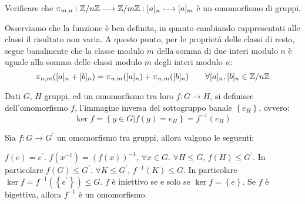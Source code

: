 \documentclass[11pt]{scrartcl}
\begin{document}
\begin{exercise}
Verificare che $\pi_{m,n}: {\mathbb Z}/n{\mathbb Z} \longrightarrow {\mathbb Z}/m{\mathbb Z} : [a]_n \longmapsto [a]_m$ è un omomorfismo di gruppi.
\end{exercise}	

\begin{soln}
Osserviamo che la funzione è ben definita, in quanto cambiando rappresentati alle classi il risultato non varia. A questo punto, per le proprietà delle classi di resto, segue banalmente che la classe modulo $m$ della somma di due interi modulo  $n$ è uguale alla somma delle classi modulo $m$ degli interi modulo $n$:
	\[ \pi_{n,m}([a]_n + [b]_n)
	=
	\pi_{n,m}([a]_n)
	+
	\pi_{n,m}([b]_n)
	\qquad
	\forall [a]_n, [b]_n \in {\mathbb Z}/n{\mathbb Z}
	\]
\end{soln}


\begin{definition}
Dati $G$, $H$ gruppi, ed un omomorfismo tra loro $f: G \longrightarrow H$, si definisce  dell'omomorfismo $f$, l'immagine inversa del sottogruppo banale $\left\{e_H\right\}$, ovvero:
	\[ \ker f = \left\{g \in G | f(g) = e_H\right\} = f^{-1}(e_H)
	\]
\end{definition}

\begin{theorem}
\label{thm:g_quattro}
Sia $f:G \longrightarrow G^{\prime}$ un omomorfismo tra gruppi, allora valgono le seguenti:
\begin{enumerate}[(1)]
	\ii $f(e)=e^{\prime}$.
	\ii $f(x^{-1})=(f(x))^{-1}$, $\forall x \in G$.
	\ii $\forall H \leqslant G$, $f(H) \leqslant G^{\prime}$. In particolare $f(G) \leqslant G^{\prime}$.
	\ii $\forall K \leqslant G^{\prime}$, $f^{-1}(K) \leqslant G$. In particolare $\ker f = f^{-1}(\left\{e^{\prime}\right\}) \leqslant G$.
	\ii $f$ è iniettivo se e solo se $\ker f = \left\{e\right\}$.
	\ii Se $f$ è bigettiva, allora $f^{-1}$ è un omomorfismo.
\end{enumerate}
\end{theorem}
\end{document}

